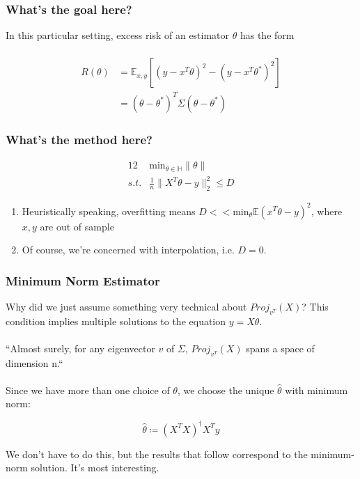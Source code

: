 \documentclass[pdf]{beamer}
\begin{document}
\begin{frame}
\frametitle{What's the goal here?}
In this particular setting, excess risk of an estimator $\theta$ has the form \\~\\

\begin{align*}
 R(\theta) & = \mathbb{E}_{x,y}[ (y-x^{T}\theta)^{2} -  (y-x^{T}\theta^{*})^{2}] \\
& = (\theta - \theta^{*})^{T}\Sigma(\theta - \theta^{*})
\end{align*}


\end{frame}

\begin{frame}
\frametitle{What's the method here?}
    \begin{alignat*}{12}
    & \text{min}_{\theta \in \mathbb{H}}\|\theta\| \\
     s.t. & \frac{1}{n}\|X^{T}\theta - y\|^{2}_{2} \leq D
    \end{alignat*}


\begin{enumerate}
\item<3-4> Heuristically speaking, overfitting means $D << \text{min}_{\theta}\mathbb{E}(x^{T}\theta - y)^{2} $, where $x, y$ are out of sample
\item<4-4> Of course, we're concerned with interpolation, i.e. $D=0$.
\end{enumerate}

\end{frame}

\begin{frame}
\frametitle{Minimum Norm Estimator}

Why did we just assume something very technical about $Proj_{v^{T}}(X)$?  This condition implies multiple solutions to the equation $y = X\theta$.
\\~\\


``Almost surely, for any eigenvector $v$ of $\Sigma$, $Proj_{v^{T}}(X)$ spans a space of dimension n.`` \\~\\

Since we have more than one choice of $\theta$, we choose the unique $\hat\theta$ with minimum norm:

\[ \hat\theta \coloneqq (X^{T}X)^{\dagger}X^{T}y \]

  We don't have to do this, but the results that follow correspond to the minimum-norm solution.  It's most interesting. \\~\\


\end{frame}
\end{document}
